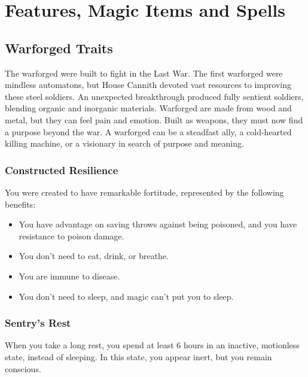 \documentclass[letterpaper,openany,oneside,twocolumn]{book}
\begin{document}
\onecolumn


\rendercharactersheet

\renderbackgroundsheet

\renderspellsheet


\restoregeometry
\twocolumn

\chapter*{Features, Magic Items and Spells}

\section*{Warforged Traits}
The warforged were built to fight in the Last War. The first warforged were mindless automatons, but House Cannith devoted vast resources to improving these steel soldiers. An unexpected breakthrough produced fully sentient soldiers, blending organic and inorganic materials. Warforged are made from wood and metal, but they can feel pain and emotion. Built as weapons, they must now find a purpose beyond the war. A warforged can be a steadfast ally, a cold-hearted killing machine, or a visionary in search of purpose and meaning.
\subsection*{Constructed Resilience}
You were created to have remarkable fortitude, represented by the following benefits:
\begin{itemize}
	\item You have advantage on saving throws against being poisoned, and you have resistance to poison damage.
	\item You don't need to eat, drink, or breathe.
	\item You are immune to disease.
	\item You don't need to sleep, and magic can't put you to sleep.
\end{itemize}
\subsection*{Sentry's Rest}
When you take a long rest, you spend at least 6 hours in an inactive, motionless state, instead of sleeping. In this state, you appear inert, but you remain conscious.
\end{document}
